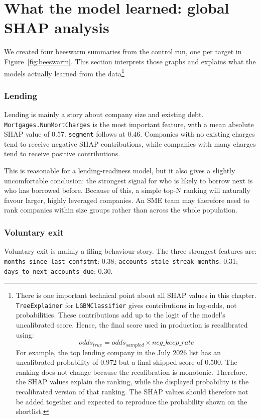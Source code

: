 \documentclass[    author={Samuel Menon Demelo; Sneha Saphala Ram Prasad; 
Viktor Ander Lindholm; Vishal Khatri},
               supervisor={Prof. Fernando Moreno-Pino},
                   degree={MSc},
                    title={Lloyds Commercial Banking Intelligence},
                 subtitle={Ranking SME Lending, Risk and Growth Prospects for Lloyds Banking Group},
                     type={},
                     year={2026}]{dissertation}
\begin{document}
\section{What the model learned: global SHAP analysis}
\label{sec:label-shap-importance}
We created four beeswarm summaries from the control run, one per target in Figure~\ref{fig:beeswarm}. This section interprets those graphs and explains what the models actually learned from the data\footnote{There is one important technical point about all SHAP values in this chapter. \texttt{TreeExplainer} for \texttt{LGBMClassifier} gives contributions in log-odds, not probabilities. These contributions add up to the logit of the model's uncalibrated score. Hence, the final score used in production is recalibrated using: $$odds_{true} = odds_{sampled} \times neg\_keep\_rate$$ For example, the top lending company in the July 2026 list has an uncalibrated probability of 0.972 but a final shipped score of 0.500. The ranking does not change because the recalibration is monotonic. Therefore, the SHAP values explain the ranking, while the displayed probability is the recalibrated version of that ranking. The SHAP values should therefore not be added together and expected to reproduce the probability shown on the shortlist.}

\subsubsection{Lending}
Lending is mainly a story about company size and existing debt. \texttt{Mortgages.NumMortCharges} is the most important feature, with a mean absolute SHAP value of 0.57. \texttt{segment} follows at 0.46. Companies with no existing charges tend to receive negative SHAP contributions, while companies with many charges tend to receive positive contributions.

This is reasonable for a lending-readiness model, but it also gives a slightly uncomfortable conclusion: the strongest signal for who is likely to borrow next is who has borrowed before. Because of this, a simple top-N ranking will naturally favour larger, highly leveraged companies. An SME team may therefore need to rank companies within size groups rather than across the whole population.

\subsubsection{Voluntary exit}

Voluntary exit is mainly a filing-behaviour story. The three strongest features are: \texttt{months\_since\_last\_confstmt}: 0.38; \texttt{accounts\_stale\_streak\_months}: 0.31; \texttt{days\_to\_next\_accounts\_due}: 0.30.
\end{document}
